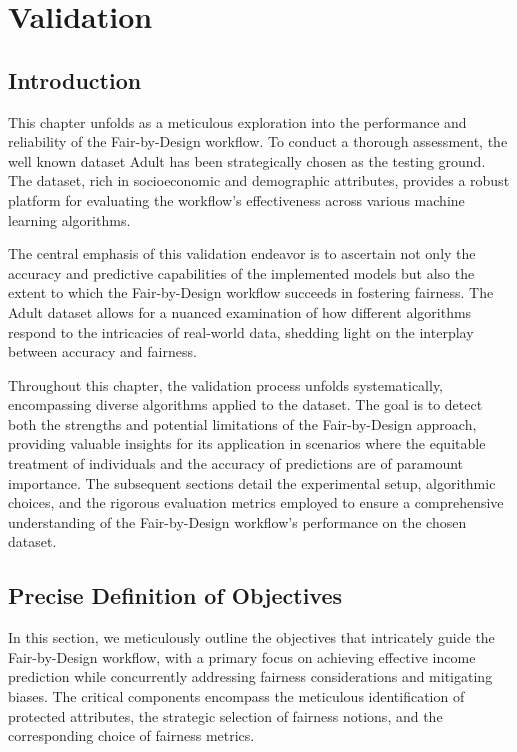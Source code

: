 \chapter{Validation}
\label{chap:validation}

\section{Introduction}

This chapter unfolds as a meticulous exploration into the performance and reliability of the Fair-by-Design workflow. To conduct a thorough assessment, the well known dataset Adult has been strategically chosen as the testing ground. The dataset, rich in socioeconomic and demographic attributes, provides a robust platform for evaluating the workflow's effectiveness across various machine learning algorithms.

The central emphasis of this validation endeavor is to ascertain not only the accuracy and predictive capabilities of the implemented models but also the extent to which the Fair-by-Design workflow succeeds in fostering fairness. The Adult dataset allows for a nuanced examination of how different algorithms respond to the intricacies of real-world data, shedding light on the interplay between accuracy and fairness.

Throughout this chapter, the validation process unfolds systematically, encompassing diverse algorithms applied to the dataset. The goal is to detect both the strengths and potential limitations of the Fair-by-Design approach, providing valuable insights for its application in scenarios where the equitable treatment of individuals and the accuracy of predictions are of paramount importance. The subsequent sections detail the experimental setup, algorithmic choices, and the rigorous evaluation metrics employed to ensure a comprehensive understanding of the Fair-by-Design workflow's performance on the chosen dataset.

\section{Precise Definition of Objectives}
\label{section:val_obj}

In this section, we meticulously outline the objectives that intricately guide the Fair-by-Design workflow, with a primary focus on achieving effective income prediction while concurrently addressing fairness considerations and mitigating biases. The critical components encompass the meticulous identification of protected attributes, the strategic selection of fairness notions, and the corresponding choice of fairness metrics.


